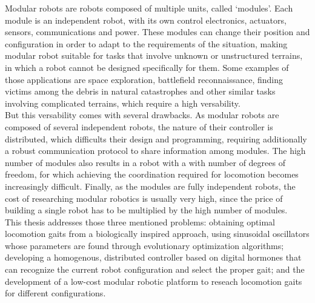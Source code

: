 Modular robots are robots composed of multiple units, called `modules'. Each module is an independent robot, with its own control electronics, actuators, sensors, communications and power. These modules can change their position and configuration in order to adapt to the requirements of the situation, making modular robot suitable for tasks that involve unknown or unstructured terrains, in which a robot cannot be designed specifically for them. Some examples of those applications are space exploration, battlefield reconnaissance, finding victims among the debris in natural catastrophes and other similar tasks involving complicated terrains, which require a high versability.\\

But this versability comes with several drawbacks. As modular robots are composed of several independent robots, the nature of their controller is distributed, which difficults their design and programming, requiring additionally a robust communication protocol to share information among modules. The high number of modules also results in a robot with a with number of degrees of freedom, for which achieving the coordination required for locomotion becomes increasingly difficult. Finally, as the modules are fully independent robots, the cost of researching modular robotics is usually very high, since the price of building a single robot has to be multiplied by the high number of modules.\\

This thesis addresses those three mentioned problems: obtaining optimal locomotion gaits from a biologically inspired approach, using sinusoidal oscillators whose parameters are found through evolutionary optimization algorithms; developing a homogenous, distributed controller based on digital hormones that can recognize the current robot configuration and select the proper gait; and the development of a low-cost modular robotic platform to reseach locomotion gaits for different configurations.